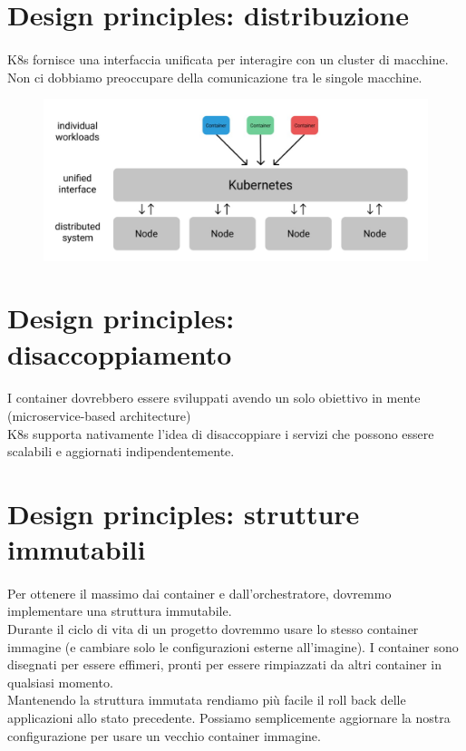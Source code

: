 \documentclass[a4paper, 12pt]{report}
\begin{document}
          \section{Design principles: distribuzione}
          \paragraph{}K8s fornisce una interfaccia unificata per interagire con un cluster di macchine. Non ci dobbiamo preoccupare della comunicazione tra le singole macchine.
          \begin{figure}[htbp]
            \centering
            \includegraphics[scale=0.4]{Immagini/k8distribuzione.png}
          \end{figure}
          \clearpage
          \section{Design principles: disaccoppiamento}
          \paragraph{}I container dovrebbero essere sviluppati avendo un solo obiettivo in mente (microservice-based architecture)\\
          K8s supporta nativamente l'idea di disaccoppiare i servizi che possono essere scalabili e aggiornati indipendentemente.
          \section{Design principles: strutture immutabili}
          \paragraph{}Per ottenere il massimo dai container e dall'orchestratore, dovremmo implementare una struttura immutabile.\\
          Durante il ciclo di vita di un progetto dovremmo usare lo stesso container immagine (e cambiare solo le configurazioni esterne all'imagine).
          I container sono disegnati per essere effimeri, pronti per essere rimpiazzati da altri container in qualsiasi momento.\\
          Mantenendo la struttura immutata rendiamo più facile il roll back delle applicazioni allo stato precedente. Possiamo semplicemente aggiornare la nostra configurazione per usare un vecchio container immagine. 
\end{document}

